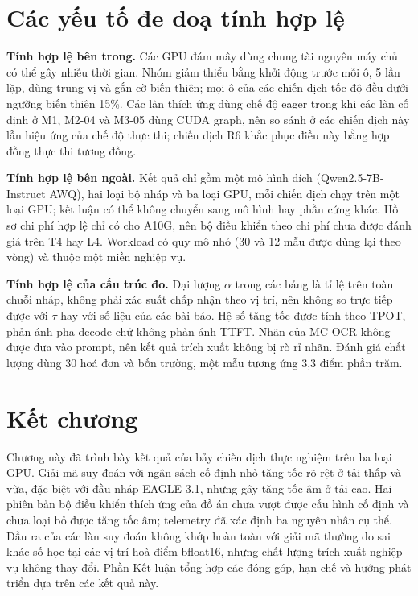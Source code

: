 \section{Các yếu tố đe doạ tính hợp lệ}
\label{sec:de-doa}

\textbf{Tính hợp lệ bên trong.} Các GPU đám mây dùng chung tài nguyên máy chủ có thể gây nhiễu thời gian. Nhóm giảm thiểu bằng khởi động trước mỗi ô, 5 lần lặp, dùng trung vị và gắn cờ biến thiên; mọi ô của các chiến dịch tốc độ đều dưới ngưỡng biến thiên 15\%. Các làn thích ứng dùng chế độ eager trong khi các làn cố định ở M1, M2-04 và M3-05 dùng CUDA graph, nên so sánh ở các chiến dịch này lẫn hiệu ứng của chế độ thực thi; chiến dịch R6 khắc phục điều này bằng hợp đồng thực thi tương đồng.

\textbf{Tính hợp lệ bên ngoài.} Kết quả chỉ gồm một mô hình đích (Qwen2.5-7B-Instruct AWQ), hai loại bộ nháp và ba loại GPU, mỗi chiến dịch chạy trên một loại GPU; kết luận có thể không chuyển sang mô hình hay phần cứng khác. Hồ sơ chi phí hợp lệ chỉ có cho A10G, nên bộ điều khiển theo chi phí chưa được đánh giá trên T4 hay L4. Workload có quy mô nhỏ (30 và 12 mẫu được dùng lại theo vòng) và thuộc một miền nghiệp vụ.

\textbf{Tính hợp lệ của cấu trúc đo.} Đại lượng $\alpha$ trong các bảng là tỉ lệ trên toàn chuỗi nháp, không phải xác suất chấp nhận theo vị trí, nên không so trực tiếp được với $\tau$ hay với số liệu của các bài báo. Hệ số tăng tốc được tính theo TPOT, phản ánh pha decode chứ không phản ánh TTFT. Nhãn của MC-OCR không được đưa vào prompt, nên kết quả trích xuất không bị rò rỉ nhãn. Đánh giá chất lượng dùng 30 hoá đơn và bốn trường, một mẫu tương ứng 3,3 điểm phần trăm.

\section{Kết chương}

Chương này đã trình bày kết quả của bảy chiến dịch thực nghiệm trên ba loại GPU. Giải mã suy đoán với ngân sách cố định nhỏ tăng tốc rõ rệt ở tải thấp và vừa, đặc biệt với đầu nháp EAGLE-3.1, nhưng gây tăng tốc âm ở tải cao. Hai phiên bản bộ điều khiển thích ứng của đồ án chưa vượt được cấu hình cố định và chưa loại bỏ được tăng tốc âm; telemetry đã xác định ba nguyên nhân cụ thể. Đầu ra của các làn suy đoán không khớp hoàn toàn với giải mã thường do sai khác số học tại các vị trí hoà điểm bfloat16, nhưng chất lượng trích xuất nghiệp vụ không thay đổi. Phần Kết luận tổng hợp các đóng góp, hạn chế và hướng phát triển dựa trên các kết quả này.
